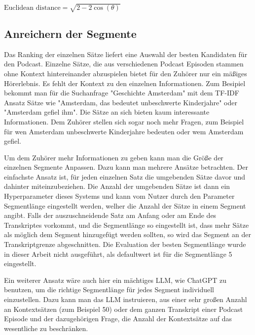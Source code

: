 $\text{Euclidean distance} = \sqrt{2 - 2 \cos(\theta)}$



\subsection{Anreichern der Segmente}

Das Ranking der einzelnen Sätze liefert eine Auswahl der besten Kandidaten für den Podcast.
Einzelne Sätze, die aus verschiedenen Podcast Episoden stammen ohne Kontext hintereinander abzuspielen bietet für den Zuhörer nur ein mäßiges Hörerlebnis. 
Es fehlt der Kontext zu den einzelnen Informationen.
Zum Besipiel bekommt man für die Suchanfrage "Geschichte Amsterdam" mit dem TF-IDF Ansatz Sätze wie "Amsterdam, das bedeutet unbeschwerte Kinderjahre" oder "Amsterdam gefiel ihm".
Die Sätze an sich bieten kaum interessante Informationen.
Dem Zuhörer stellen sich sogar noch mehr Fragen, zum Beispiel für wen Amsterdam unbeschwerte Kinderjahre bedeuten oder wem Amsterdam gefiel.

Um dem Zuhörer mehr Informationen zu geben kann man die Größe der einzelnen Segmente Anpassen.
Dazu kann man mehrere Ansätze betrachten.
Der einfachste Ansatz ist, für jeden einzelnen Satz die umgebenden Sätze davor und dahinter miteinzubeziehen.
Die Anzahl der umgebenden Sätze ist dann ein Hyperparameter dieses Systems und kann vom Nutzer durch den Parameter Segmentlänge eingestellt werden, welher die Anzahl der Sätze in einem Segment angibt.
Falls der auszuschneidende Satz am Anfang oder am Ende des Transkriptes vorkommt, und die Segmentlänge so eingestellt ist, dass mehr Sätze als möglich dem Segment hinzugefügt werden sollten, so wird das Segment an der Transkriptgrenze abgeschnitten.
Die Evaluation der besten Segmentlänge wurde in dieser Arbeit nicht ausgeführt, als defaultwert ist für die Segmentlänge 5 eingestellt.

Ein weiterer Ansatz wäre auch hier ein mächtiges LLM, wie ChatGPT zu benutzen, um die richtige Segmentlänge für jedes Segment individuell einzustellen.
Dazu kann man das LLM instruieren, aus einer sehr großen Anzahl an Kontextsätzen (zum Beispiel 50) oder dem ganzen Transkript einer Podcast Episode und der dazugehörigen Frage, die Anzahl der Kontextsätze auf das wesentliche zu beschränken.


